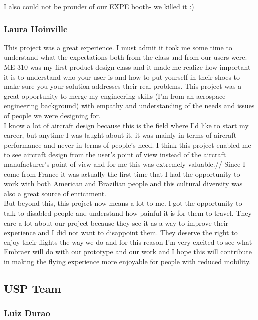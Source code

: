I also could not be prouder of our EXPE booth- we killed it  :)

\subsubsection{Laura Hoinville}

This project was a great experience. I must admit it took me some time to understand what the expectations both from the class and from our users were. ME 310 was my first product design class and it made me realize how important it is to understand who your user is and how to put yourself in their shoes to make sure you your solution addresses their real problems. This project was a great opportunity to merge my engineering skills (I’m from an aerospace engineering background) with empathy and understanding of the needs and issues of people we were designing for.\\

I know a lot of aircraft design because this is the field where I’d like to start my career, but anytime I was taught about it, it was mainly in terms of aircraft performance and never in terms of people’s need. I think this project enabled me to see aircraft design from the user’s point of view instead of the aircraft manufacturer’s point of view and for me this was extremely valuable.//
Since I come from France it was actually the first time that I had the opportunity to work with both American and Brazilian people and this cultural diversity was also a great source of enrichment.\\

But beyond this, this project now means a lot to me. I got the opportunity to talk to disabled people and understand how painful it is for them to travel. They care a lot about our project because they see it as a way to improve their experience and I did not want to disappoint them. They deserve the right to enjoy their flights the way we do and for this reason I’m very excited to see what Embraer will do with our prototype and our work and I hope this will contribute in making the flying experience more enjoyable for people with reduced mobility. 


\subsection{USP Team}

\subsubsection{Luiz Durao}

